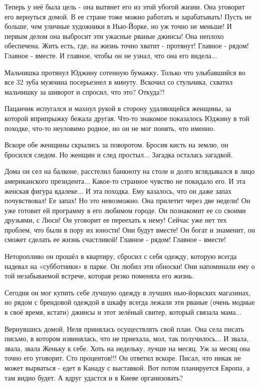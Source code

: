 Теперь у неё была цель - она вытянет его из этой убогой жизни. Она уговорит его
вернуться домой. В ее стране тоже можно работать и зарабатывать! Пусть не
больше, чем уличные художники в Нью-Йорке, но уж точно не меньше! И первым делом
она выбросит эти ужасные рваные джинсы! Она неплохо обеспечена. Жить есть, где, на
жизнь точно хватит - протянут! Главное - рядом! Главное - вместе. И
главное, чтобы он не узнал, что она его видела...

Мальчишка протянул Юджину сотенную бумажку. Только что улыбавшийся во все 32
зуба мужчина посерьезнел в минуту. Вскочил со стульчика, схватил мальчишку за
шиворот и спросил, что это? Откуда?! 

Пацанчик испугался и махнул рукой в сторону удаляющейся женщины, за которой
вприпрыжку бежала другая. Что-то знакомое показалось Юджину в той походке, что-то
неуловимо родное, но он не мог понять, что именно.

Вскоре обе женщины скрылись за поворотом. Бросив кисть на землю, он бросился
следом. Но женщин и след простыл... Загадка осталась загадкой.

Дома он сел на балконе, расстелил банкноту на столе и долго вглядывался в лицо
американского президента... Какое-то странное чувство не покидало его. И эта
женская фигура вдалеке... И эта походка. Ему казалось, что он даже запах
почувствовал! Ее запах! Но это невозможно. Она прилетит через две недели! Он уже
готовит ей программу в его любимом городе. Он познакомит ее со своими друзьями, с
Люси! Он уговорит ее переехать к нему! Сейчас уже нет тех проблем, что были в
пору их юности! Они будут вместе! Он богат и знаменит, он сможет сделать ее
жизнь счастливой! Главное - рядом! Главное - вместе! 

Неторопливо он прошёл в квартиру, сбросил с себя одежду, которую всегда надевал
на «субботники» в парке. Он любил эти обноски! Они напоминали ему о той
незабываемой встрече, которая резко поменяла его жизнь.

Сегодня он мог купить себе лучшую одежду в лучших нью-йоркских магазинах, но
рядом с брендовой одеждой в шкафу всегда лежали эти рваные (очень модные в своё
время, кстати) джинсы и этот зелёный свитер, который связала мама...

Вернувшись домой, Неля принялась осуществлять свой план. Она села писать
письмо, в котором извинялась, что не приехала, мол, так получилось... И
звала, звала, звала Женьку к себе. Хоть на недельку, лучше на месяц. Уж за месяц она
точно его уговорит. Сто процентов!!! Он ответил вскоре. Писал, что никак не может
вырваться - едет в Канаду с выставкой. Вот потом планируется Европа, а там видно
будет. А вдруг удастся и в Киеве организовать? 

